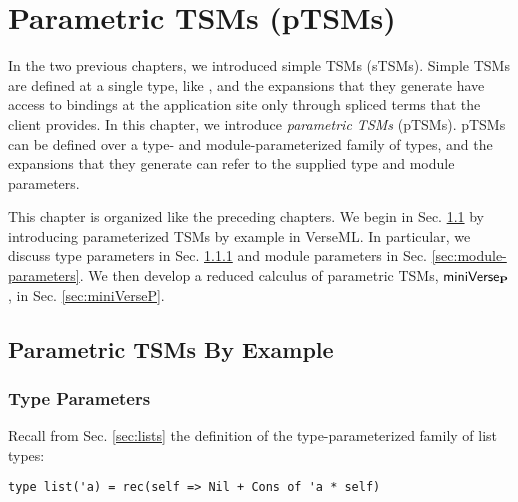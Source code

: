 
\chapter{Parametric TSMs (pTSMs)}\label{chap:ptsms}
In the two previous chapters, we introduced simple TSMs (sTSMs). Simple TSMs are defined at a single type, like , and the expansions that they generate have access to bindings at the application site only through spliced terms that the client provides. In this chapter, we introduce \emph{parametric TSMs} (pTSMs). pTSMs can be defined over a type- and module-parameterized family of types, and the expansions that they generate can refer to the supplied type and module parameters. 

This chapter is organized like the preceding chapters. We begin in Sec. \ref{sec:parameterized-tsms-by-example} by introducing parameterized TSMs by example in VerseML. In particular, we discuss type parameters in Sec. \ref{sec:type-parameters} and module parameters in Sec. \ref{sec:module-parameters}. We then develop a reduced calculus of parametric TSMs, $\mathsf{miniVerse}_\textbf{P}$, in Sec. \ref{sec:miniVerseP}.
\section{Parametric TSMs By Example}\label{sec:parameterized-tsms-by-example}

\subsection{Type Parameters}\label{sec:type-parameters}
Recall from Sec. \ref{sec:lists} the definition of the type-parameterized family of list types:
\begin{lstlisting}[numbers=none]
type list('a) = rec(self => Nil + Cons of 'a * self)
\end{lstlisting}


